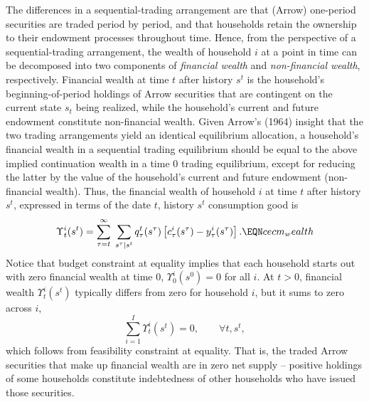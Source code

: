 The differences in a sequential-trading arrangement are that (Arrow)
one-period securities are traded period by period, and that households
retain the ownership to their endowment processes throughout time.
Hence, from the perspective of a sequential-trading arrangement, the
wealth of household $i$ at a point in time can be decomposed into two
components of {\it financial wealth} and {\it non-financial wealth},
respectively.
Financial wealth at time $t$ after history $s^t$ is the household's
beginning-of-period holdings of Arrow securities that are contingent on
the current state $s_t$ being realized,
while the household's current and future endowment constitute non-financial
wealth. Given Arrow's (1964) insight that the two trading arrangements
yield an identical equilibrium allocation, a household's financial wealth
in a sequential trading equilibrium should be equal to the above implied
continuation wealth in a time $0$ trading equilibrium, except for reducing
the latter by the value of the household's current and future endowment
(non-financial wealth). Thus, the
financial wealth of household $i$ at time $t$ after history $s^t$,
expressed in terms of the date $t$, history $s^t$ consumption good is
$$
\Upsilon^i_t(s^t) =
\sum_{\tau=t}^\infty \; \sum_{s^\tau \vert s^t}
    q_\tau^t(s^\tau) \left[ c^i_\tau(s^\tau) - y_\tau^i(s^\tau) \right]. \EQN cecm_wealth$$
Notice that budget constraint  at equality implies that
each household starts out with zero financial wealth at time $0$,
$\Upsilon^i_0(s^0)=0$ for all $i$. At $t >0$, financial wealth
$\Upsilon^i_t(s^t)$ typically differs from zero for household $i$,
but it sums to zero across $i$,
$$
\sum_{i=1}^{I}  \Upsilon^i_t(s^t) = 0, \qquad \forall t, s^t,
$$
which follows from feasibility constraint  at equality.
That is, the traded Arrow securities that make up financial
wealth are in zero net supply -- positive holdings of some households
constitute indebtedness of other households who have issued those
securities.





